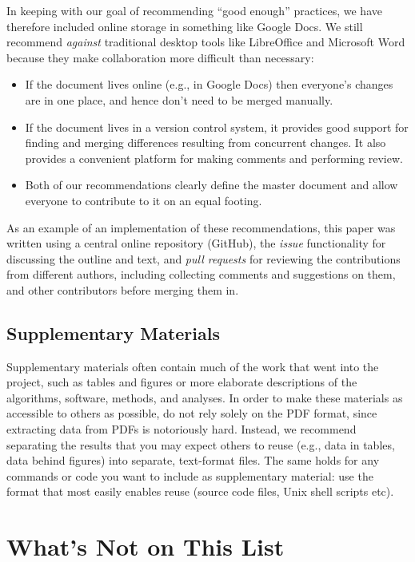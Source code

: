 \documentclass[10pt]{article}
\begin{document}
In keeping with our goal of recommending ``good enough'' practices, we
have therefore included online storage in something like Google Docs. We
still recommend \emph{against} traditional desktop tools like
LibreOffice and Microsoft Word because they make collaboration more
difficult than necessary:

\begin{itemize}
\item
  If the document lives online (e.g., in Google Docs) then everyone's
  changes are in one place, and hence don't need to be merged manually.
\item
  If the document lives in a version control system, it provides good
  support for finding and merging differences resulting from concurrent
  changes. It also provides a convenient platform for making comments
  and performing review.
\item
  Both of our recommendations clearly define the master document and
  allow everyone to contribute to it on an equal footing.
\end{itemize}

As an example of an implementation of these recommendations, this paper
was written using a central online repository (GitHub), the \emph{issue}
functionality for discussing the outline and text, and \emph{pull
requests} for reviewing the contributions from different authors,
including collecting comments and suggestions on them, and other
contributors before merging them in.

\subsection*{Supplementary Materials}

Supplementary materials often contain much of the work that went into
the project, such as tables and figures or more elaborate descriptions
of the algorithms, software, methods, and analyses. In order to make
these materials as accessible to others as possible, do not rely solely
on the PDF format, since extracting data from PDFs is notoriously hard.
Instead, we recommend separating the results that you may expect others
to reuse (e.g., data in tables, data behind figures) into separate,
text-format files. The same holds for any commands or code you want to
include as supplementary material: use the format that most easily
enables reuse (source code files, Unix shell scripts etc).

\section{What's Not on This List}\label{sec:omitted}
\end{document}
